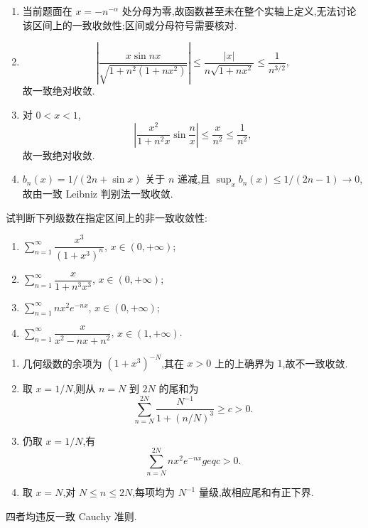 \begin{solution}
    \leavevmode
    \begin{enumerate}
        \item 当前题面在 $x=-n^{-\alpha}$ 处分母为零,故函数甚至未在整个实轴上定义,无法讨论该区间上的一致收敛性;区间或分母符号需要核对.
        \item
              \[
                  \left|\dfrac{x\sin nx}{\sqrt{1+n^2(1+nx^2)}}\right|
                  \leq\dfrac{|x|}{n\sqrt{1+nx^2}}\leq\dfrac{1}{n^{3/2}},
              \]
              故一致绝对收敛.
        \item 对 $0<x<1$,
              \[
                  \left|\dfrac{x^2}{1+n^2x}\sin\dfrac{n}{x}\right|\leq\dfrac{x}{n^2}\leq\dfrac{1}{n^2},
              \]
              故一致绝对收敛.
        \item $b_n(x)=1/(2n+\sin x)$ 关于 $n$ 递减,且
              $\sup_xb_n(x)\leq1/(2n-1)\to0$,故由一致 Leibniz 判别法一致收敛.
    \end{enumerate}
\end{solution}

\begin{example}
    试判断下列级数在指定区间上的非一致收敛性:
    \begin{enumerate}
        \item $\displaystyle\sum\limits_{n=1}^{\infty}\dfrac{x^3}{(1+x^3)^n}$, $x\in(0,+\infty)$;
        \item $\displaystyle\sum\limits_{n=1}^{\infty}\dfrac{x}{1+n^3x^3}$, $x\in(0,+\infty)$;
        \item $\displaystyle\sum\limits_{n=1}^{\infty}nx^2e^{-nx}$, $x\in(0,+\infty)$;
        \item $\displaystyle\sum\limits_{n=1}^{\infty}\dfrac{x}{x^2-nx+n^2}$, $x\in(1,+\infty)$.
    \end{enumerate}
\end{example}
\exampleblank

\begin{solution}
    \leavevmode
    \begin{enumerate}
        \item 几何级数的余项为 $(1+x^3)^{-N}$,其在 $x>0$ 上的上确界为 $1$,故不一致收敛.
        \item 取 $x=1/N$,则从 $n=N$ 到 $2N$ 的尾和为
              \[
                  \displaystyle\sum\limits_{n=N}^{2N}\dfrac{N^{-1}}{1+(n/N)^3}\geq c>0.
              \]
        \item 仍取 $x=1/N$,有
              \[
                  \displaystyle\sum\limits_{n=N}^{2N}nx^2e^{-nx}geq c>0.
              \]
        \item 取 $x=N$,对 $N\leq n\leq2N$,每项均为 $N^{-1}$ 量级,故相应尾和有正下界.
    \end{enumerate}
    四者均违反一致 Cauchy 准则.
\end{solution}

